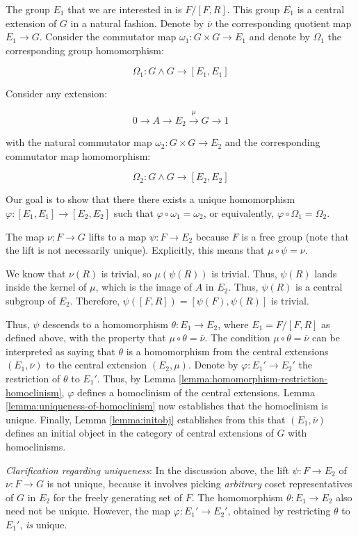 The group $E_1$ that we are interested in is $F/[F,R]$. This group
$E_1$ is a central extension of $G$ in a natural fashion. Denote by
$\overline{\nu}$ the corresponding quotient map $E_1 \to G$. Consider
the commutator map $\omega_1:G \times G \to E_1$ and denote by
$\Omega_1$ the corresponding group homomorphism:

$$\Omega_1: G \wedge G \to [E_1,E_1]$$

Consider any extension:

$$0 \to A \to E_2 \stackrel{\mu}{\to} G \to 1$$

with the natural commutator map $\omega_2:G \times G \to E_2$ and the
corresponding commutator map homomorphism:

$$\Omega_2:G \wedge G \to [E_2,E_2]$$

Our goal is to show that there there exists a unique homomorphism
$\varphi:[E_1,E_1] \to [E_2,E_2]$ such that $\varphi \circ
\omega_1 = \omega_2$, or equivalently, $\varphi \circ \Omega_1 =
\Omega_2$.

The map $\nu:F \to G$ lifts to a map $\psi:F \to E_2$ because
$F$ is a free group (note that the lift is not necessarily
unique). Explicitly, this means that $\mu \circ \psi = \nu$.

We know that $\nu(R)$ is trivial, so $\mu(\psi(R))$ is trivial. Thus,
$\psi(R)$ lands inside the kernel of $\mu$, which is the image of $A$
in $E_2$. Thus, $\psi(R)$ is a central subgroup of $E_2$. Therefore,
$\psi([F,R]) = [\psi(F),\psi(R)]$ is trivial.

Thus, $\psi$ descends to a homomorphism $\theta:E_1 \to E_2$, where
$E_1 = F/[F,R]$ as defined above, with the property that $\mu \circ
\theta = \overline{\nu}$. The condition $\mu \circ \theta =
\overline{\nu}$ can be interpreted as saying that $\theta$ is a
homomorphism from the central extensions $(E_1,\overline{\nu})$ to the
central extension $(E_2,\mu)$. Denote by $\varphi:E_1' \to E_2'$ the
restriction of $\theta$ to $E_1'$. Thus, by Lemma
\ref{lemma:homomorphism-restriction-homoclinism}, $\varphi$ defines a
homoclinism of the central extensions. Lemma
\ref{lemma:uniqueness-of-homoclinism} now establishes that the
homoclinism is unique. Finally, Lemma \ref{lemma:initobj} establishes
from this that $(E_1,\overline{\nu})$ defines an initial object in the
category of central extensions of $G$ with homoclinisms.

{\em Clarification regarding uniqueness}: In the discussion above, the
lift $\psi: F \to E_2$ of $\nu:F \to G$ is not unique, because it
involves picking {\em arbitrary} coset representatives of $G$ in $E_2$
for the freely generating set of $F$. The homomorphism $\theta:E_1 \to
E_2$ also need not be unique. However, the map $\varphi:E_1' \to
E_2'$, obtained by restricting $\theta$ to $E_1'$, {\em is} unique.

